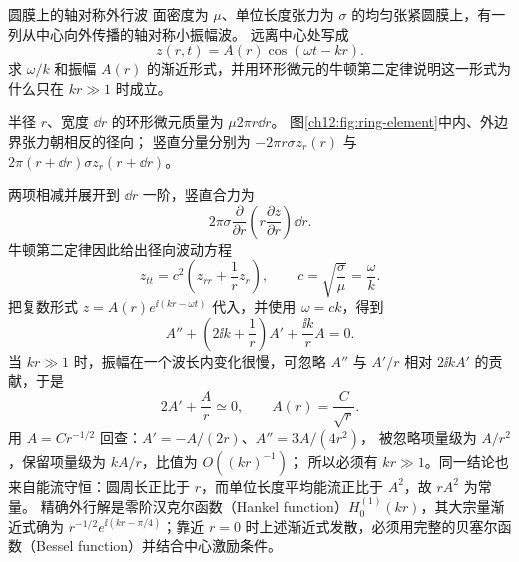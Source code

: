 \begin{origexamplebox}{圆膜上的轴对称外行波}
\label{ch12:ex:11}
面密度为 $\mu$、单位长度张力为 $\sigma$ 的均匀张紧圆膜上，有一列从中心向外传播的轴对称小振幅波。
远离中心处写成
\[
 z(r,t)=A(r)\cos(\omega t-kr).
\]
求 $\omega/k$ 和振幅 $A(r)$ 的渐近形式，并用环形微元的牛顿第二定律说明这一形式为什么只在 $kr\gg1$ 时成立。
\end{origexamplebox}
\begin{xesolution}
半径 $r$、宽度 $\dd r$ 的环形微元质量为 $\mu2\pi r\dd r$。
图\ref{ch12:fig:ring-element}中内、外边界张力朝相反的径向；
竖直分量分别为 $-2\pi r\sigma z_r(r)$ 与 $2\pi(r+\dd r)\sigma z_r(r+\dd r)$。
\begin{center}
\label{ch12:fig:ring-element}
\end{center}
两项相减并展开到 $\dd r$ 一阶，竖直合力为
\[
 2\pi\sigma\frac{\partial}{\partial r}
 \left(r\frac{\partial z}{\partial r}\right)\dd r.
\]
牛顿第二定律因此给出径向波动方程
\[
 z_{tt}=c^2\left(z_{rr}+\frac1r z_r\right),
 \qquad
 \boxed{c=\sqrt{\frac\sigma\mu}=\frac\omega k}.
\]
把复数形式 $z=A(r)e^{\ii(kr-\omega t)}$ 代入，并使用 $\omega=ck$，得到
\[
 A''+\left(2\ii k+\frac1r\right)A'
 +\frac{\ii k}{r}A=0.
\]
当 $kr\gg1$ 时，振幅在一个波长内变化很慢，可忽略 $A''$ 与 $A'/r$ 相对 $2\ii kA'$ 的贡献，于是
\[
 2A'+\frac Ar\simeq0,
 \qquad
 \boxed{A(r)=\frac{C}{\sqrt r}}.
\]
用 $A=C r^{-1/2}$ 回查：$A'=-A/(2r)$、$A''=3A/(4r^2)$，
被忽略项量级为 $A/r^2$，保留项量级为 $kA/r$，比值为 $O((kr)^{-1})$；
所以必须有 $kr\gg1$。同一结论也来自能流守恒：圆周长正比于 $r$，而单位长度平均能流正比于 $A^2$，故 $rA^2$ 为常量。
精确外行解是零阶汉克尔函数（Hankel function）$H_0^{(1)}(kr)$，其大宗量渐近式确为
$r^{-1/2}e^{\ii(kr-\pi/4)}$；靠近 $r=0$ 时上述渐近式发散，必须用完整的贝塞尔函数（Bessel function）并结合中心激励条件。
\end{xesolution}

